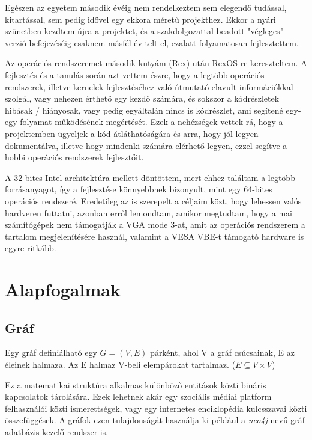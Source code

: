 \documentclass[12pt,numbers=noenddot]{report}
\begin{document}
Egészen az egyetem második évéig nem rendelkeztem sem elegendő tudással,
kitartással, sem pedig idővel egy ekkora méretű projekthez. Ekkor a nyári
szünetben kezdtem újra a projektet, és a szakdolgozattal beadott "végleges"
verzió befejezéséig csaknem másfél év telt el, ezalatt folyamatosan
fejlesztettem.

Az operációs rendszeremet második kutyám (Rex) után RexOS-re kereszteltem. A
fejlesztés és a tanulás során azt vettem észre, hogy a legtöbb operációs
rendszerek, illetve kernelek fejlesztéséhez való útmutató elavult információkkal
szolgál, vagy nehezen érthető egy kezdő számára, és sokszor a kódrészletek
hibásak / hiányosak, vagy pedig egyáltalán nincs is kódrészlet, ami segítené
egy-egy folyamat működésének megértését.
Ezek a nehézségek vettek rá, hogy a projektemben ügyeljek a kód átláthatóságára
és arra, hogy jól legyen dokumentálva, illetve hogy mindenki számára elérhető
legyen, ezzel segítve a hobbi operációs rendszerek fejlesztőit.

A 32-bites Intel architektúra mellett döntöttem, mert ehhez találtam a legtöbb
forrásanyagot, így a fejlesztése könnyebbnek bizonyult, mint egy 64-bites
operációs rendszeré. Eredetileg az is szerepelt a céljaim közt, hogy
lehessen valós hardveren futtatni, azonban erről lemondtam, amikor megtudtam,
hogy a mai számítógépek nem támogatják a VGA mode 3-at, amit az operációs
rendszerem a tartalom megjelenítésére használ, valamint a VESA VBE-t támogató
hardware is egyre ritkább.


\chapter{Alapfogalmak}
\pagestyle{fancy}

\section{Gráf}

Egy gráf definiálható egy $G=(V,E)$ párként, ahol V a gráf csúcsainak, E az 
éleinek halmaza. Az E halmaz V-beli elempárokat tartalmaz. 
($E \subseteq V \times V$)

Ez a matematikai struktúra alkalmas különböző entitások közti bináris kapcsolatok 
tárolására. Ezek lehetnek akár egy szociális médiai platform felhasználói közti 
ismerettségek, vagy egy internetes enciklopédia kulcsszavai közti összefüggések. 
A gráfok ezen tulajdonságát használja ki például a \textit{neo4j} nevű gráf 
adatbázis kezelő rendszer is.
\end{document}
